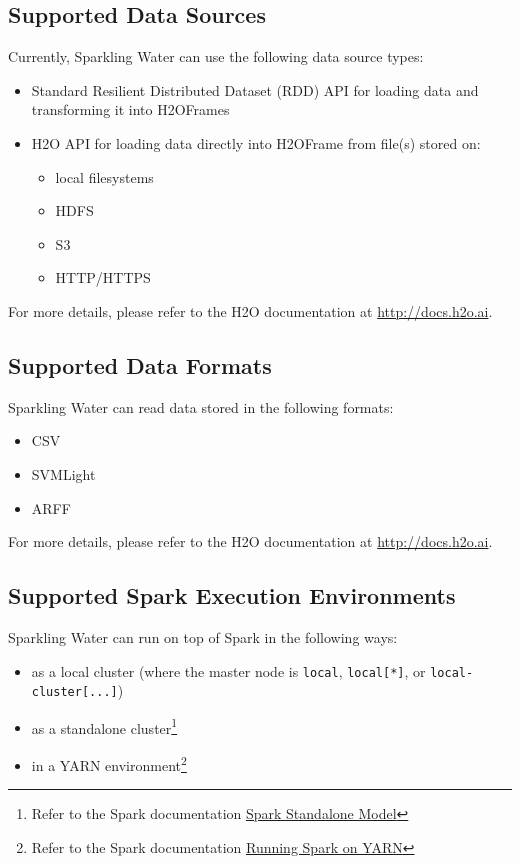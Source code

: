 \documentclass{standalone}
\begin{document}
\subsection{Supported Data Sources}

Currently, Sparkling Water can use the following data source types:

\begin{itemize}

 \item Standard Resilient Distributed Dataset (RDD) API for loading data and transforming it into H2OFrames
 \item H2O API for loading data directly into H2OFrame from file(s) stored on:
  \begin{itemize}
    \item local filesystems
    \item HDFS
    \item S3
    \item HTTP/HTTPS
  \end{itemize}
\end{itemize}

For more details, please refer to the H2O documentation at {\url{http://docs.h2o.ai}}.

\subsection{Supported Data Formats}

Sparkling Water can read data stored in the following formats:

\begin{itemize}

  \item CSV
  \item SVMLight
  \item ARFF
\end{itemize}

For more details, please refer to the H2O documentation at {\url{http://docs.h2o.ai}}.

\subsection{Supported Spark Execution Environments}
Sparkling Water can run on top of Spark in the following ways:
\begin{itemize}
  \item as a local cluster (where the master node is \texttt{local},
\texttt{local[*]}, or \texttt{local-cluster[...]})
  \item as a standalone cluster\footnote{Refer to the Spark documentation
\href{http://spark.apache.org/docs/latest/spark-standalone.html}{Spark
Standalone Model}}
  \item in a YARN environment\footnote{Refer to the Spark documentation \href{http://spark.apache.org/docs/latest/running-on-yarn.html}{Running
Spark on YARN}}

\end{itemize}
\end{document}
